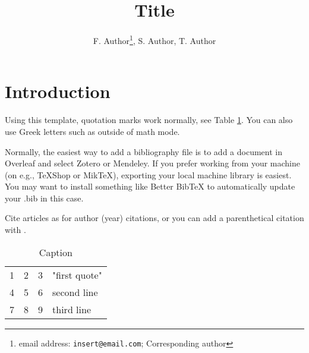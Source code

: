 \documentclass[12pt, letterpaper]{article}
\title{Title}
\author{F. Author\thanks{email address: \texttt{insert@email.com}; Corresponding author}, S. Author, T. Author}
\date{}
\newcommand{\beginsupplement}{%
        \setcounter{table}{0}
        \renewcommand{\thetable}{S\arabic{table}}%
        \setcounter{figure}{0}
        \renewcommand{\thefigure}{S\arabic{figure}}%
     }
\begin{document}
\maketitle

\begin{abstract}
    \noindent \lipsum[1]
\end{abstract}

\section{Introduction}

\lipsum[2]

Using this template, quotation marks work normally, see Table \ref{tab:example}. You can also use Greek letters such as \texttheta{} outside of math mode. 

Normally, the easiest way to add a bibliography file is to add a document in Overleaf and select Zotero or Mendeley. If you prefer working from your machine (on e.g., TeXShop or MikTeX), exporting your local machine library is easiest. You may want to install something like Better BibTeX to automatically update your .bib in this case. 

Cite articles as \textcite{ostrom_governing_1990} for author (year) citations, or you can add a parenthetical citation with \autocite{ostrom_governing_1990}. 


\begin{table}[ht]
    \centering
    \caption{Caption}
    \begin{tabular}{ l | c | r | p{3cm}}
        \hline			
        1 & 2 & 3 & "first quote" \\
        4 & 5 & 6 & second line \\
        7 & 8 & 9 & third line \\
        \hline  
    \end{tabular}
    \label{tab:example}
\end{table}


\iffalse

\begin{figure}
    \centering
    \texttt{[image: figures/]}
    \caption{Caption}
    \label{fig:example}
\end{figure}

\fi

\printbibliography

\beginsupplement

\end{document}

